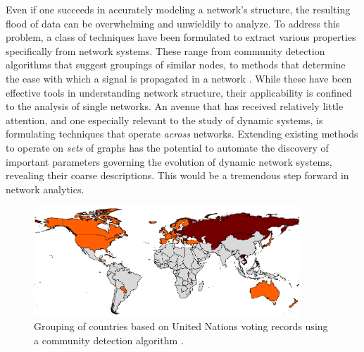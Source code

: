 \documentclass[11pt]{article}
\begin{document}
\indent Even if one succeeds in accurately modeling a network's structure, the resulting flood of data can be overwhelming and unwieldily to analyze. To address this problem, a class of techniques have been formulated to extract various properties specifically from network systems. These range from community detection algorithms that suggest groupings of similar nodes, to methods that determine the ease with which a signal is propagated in a network \cite{Kleinberg1999} \cite{Newman2004} \cite{Latora2001}. While these have been effective tools in understanding network structure, their applicability is confined to the analysis of single networks. An avenue that has received relatively little attention, and one especially relevant to the study of dynamic systems, is formulating techniques that operate \textit{across} networks. Extending existing methods to operate on \textit{sets} of graphs has the potential to automate the discovery of important parameters governing the evolution of dynamic network systems, revealing their coarse descriptions. This would be a tremendous step forward in network analytics.\vspace{1mm}\\
\begin{figure}[h!]
  \centering
  \includegraphics[width=10cm]{unCommunityDetection}
  \caption{Grouping of countries based on United Nations voting records using a community detection algorithm \cite{porter}.}
  \label{fig:un}
\end{figure}
\vspace{1mm}\\
\end{document}
